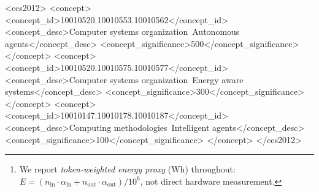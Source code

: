 \documentclass[sigconf,authordraft]{acmart}
\begin{document}
\begin{abstract}
We evaluate Joule against CrewAI and LangChain on a 50-task benchmark (3 runs per task) spanning five categories.
On \emph{research} and \emph{multi-step} tasks---where multi-step planning adds genuine value---Joule reduces token-weighted inference cost\footnote{We report \emph{token-weighted energy proxy} (Wh) throughout: $E = (n_{\text{in}} \cdot \alpha_{\text{in}} + n_{\text{out}} \cdot \alpha_{\text{out}}) / 10^6$, not direct hardware measurement.} by 28\% and 30\% vs.\ CrewAI, while achieving \textbf{3.9$\times$} and \textbf{2.8$\times$} lower latency.
The confidence-aware adaptive controller eliminates the quality regression seen with binary pruning: multi-step quality fully recovers to parity with no-pruning (4.40 vs.\ 4.40), and overall quality improves from 4.49 to 4.61.
Prompt optimization is the dominant energy mechanism: disabling it multiplies energy proxy by \textbf{4.0$\times$} and LLM calls from 1.5 to 5.3 per task.
Budget enforcement provides zero resource violations across 150 executions.
\end{abstract}

\begin{CCSXML}
<ccs2012>
  <concept>
    <concept_id>10010520.10010553.10010562</concept_id>
    <concept_desc>Computer systems organization~Autonomous agents</concept_desc>
    <concept_significance>500</concept_significance>
  </concept>
  <concept>
    <concept_id>10010520.10010575.10010577</concept_id>
    <concept_desc>Computer systems organization~Energy aware systems</concept_desc>
    <concept_significance>300</concept_significance>
  </concept>
  <concept>
    <concept_id>10010147.10010178.10010187</concept_id>
    <concept_desc>Computing methodologies~Intelligent agents</concept_desc>
    <concept_significance>100</concept_significance>
  </concept>
</ccs2012>
\end{CCSXML}



\maketitle

\end{document}
